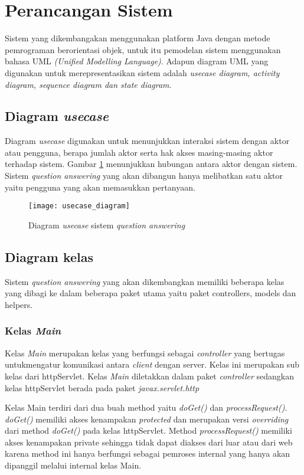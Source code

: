 \section{Perancangan Sistem}
Sistem yang dikembangakan menggunakan platform Java dengan metode pemrograman berorientasi objek, untuk itu pemodelan sistem menggunakan bahasa UML \emph{(Unified Modelling Language)}. Adapun diagram UML yang digunakan untuk merepresentasikan sistem adalah \emph{usecase diagram, activity diagram, sequence diagram dan state diagram}. 

\subsection{Diagram \emph{usecase}}
Diagram \emph{usecase} digunakan untuk menunjukkan interaksi sistem dengan aktor atau pengguna, berapa jumlah aktor serta hak akses masing-masing aktor terhadap sistem. Gambar \ref{fig:usecase_diagram} menunjukkan hubungan antara aktor dengan sistem. Sistem \emph{question answering} yang akan dibangun hanya melibatkan satu aktor yaitu pengguna yang akan memasukkan pertanyaan.
\begin{figure}[ht]
    \centering
    \texttt{[image: usecase\_diagram]}
    \caption{Diagram \emph{usecase} sistem \emph{question answering}}
    \label{fig:usecase_diagram}
\end{figure}

\subsection{Diagram kelas}
Sistem \emph{question answering} yang akan dikembangkan memiliki beberapa kelas yang dibagi ke dalam beberapa paket utama yaitu paket controllers, models dan helpers.

\subsubsection{Kelas \emph{Main}}
Kelas \emph{Main} merupakan kelas yang berfungsi sebagai \emph{controller} yang bertugas untukmengatur komunikasi antara \emph{client} dengan server. Kelas ini merupakan sub kelas dari httpServlet. Kelas \emph{Main} diletakkan dalam paket \emph{controller} sedangkan kelas httpServlet berada pada paket \emph{javax.servlet.http}

Kelas Main terdiri dari dua buah method yaitu \emph{doGet()} dan \emph{processRequest()}. \emph{doGet()} memiliki akses kenampakan \emph{protected} dan merupakan versi \emph{overriding} dari method \emph{doGet()} pada kelas httpServlet. Method \emph{processRequest()} memiliki akses kenampakan private sehingga tidak dapat diakses dari luar atau dari web karena method ini hanya berfungsi sebagai pemroses internal yang hanya akan dipanggil melalui internal kelas Main.

